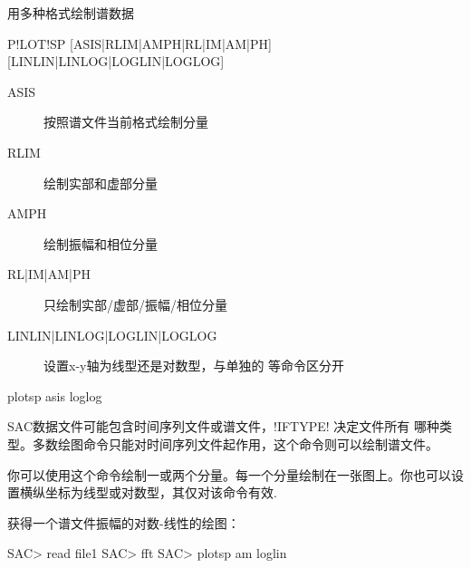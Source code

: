 \label{cmd:plotsp}

用多种格式绘制谱数据

\begin{SACSTX}
P!LOT!SP [ASIS|RLIM|AMPH|RL|IM|AM|PH] [LINLIN|LINLOG|LOGLIN|LOGLOG]
\end{SACSTX}

\begin{description}
\item [ASIS] 按照谱文件当前格式绘制分量
\item [RLIM] 绘制实部和虚部分量
\item [AMPH] 绘制振幅和相位分量
\item [RL|IM|AM|PH] 只绘制实部/虚部/振幅/相位分量
\item [LINLIN|LINLOG|LOGLIN|LOGLOG] 设置x-y轴为线型还是对数型，与单独的
     等命令区分开
\end{description}

\begin{SACDFT}
plotsp asis loglog
\end{SACDFT}

SAC数据文件可能包含时间序列文件或谱文件，!IFTYPE! 决定文件所有
哪种类型。多数绘图命令只能对时间序列文件起作用，这个命令则可以绘制谱文件。

你可以使用这个命令绘制一或两个分量。每一个分量绘制在一张图上。你也可以设
置横纵坐标为线型或对数型，其仅对该命令有效.

获得一个谱文件振幅的对数-线性的绘图：
\begin{SACCode}
SAC> read file1
SAC> fft
SAC> plotsp am loglin
\end{SACCode}
